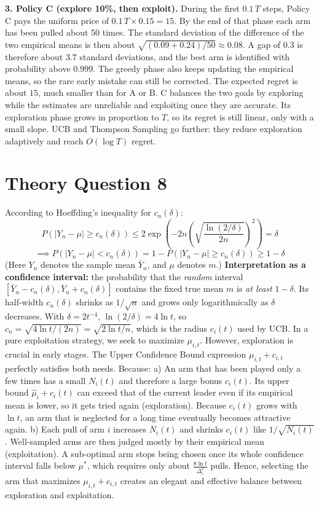 \documentclass[12pt,a4paper]{article}
\begin{document}
\textbf{3. Policy C (explore 10\%, then exploit).}
During the first $0.1\,T$ steps, Policy C pays the uniform price of $0.1\,T \times 0.15 = 15$.
By the end of that phase each arm has been pulled about 50 times.
The standard deviation of the difference of the two empirical means is then about $\sqrt{(0.09+0.24)/50} \approx 0.08$.
A gap of $0.3$ is therefore about $3.7$ standard deviations, and the best arm is identified with probability above $0.999$.
The greedy phase also keeps updating the empirical means, so the rare early mistake can still be corrected.
The expected regret is about $15$, much smaller than for A or B.
C balances the two goals by exploring while the estimates are unreliable and exploiting once they are accurate.
Its exploration phase grows in proportion to $T$, so its regret is still linear, only with a small slope.
UCB and Thompson Sampling go further: they reduce exploration adaptively and reach $O(\log T)$ regret.
%

\section*{Theory Question 8} %
According to Hoeffding's inequality for $c_n(\delta)$: %
\[
P(|Y_n - \mu| \geq c_n(\delta)) \leq 2 \exp\left( -2n \left(\sqrt{\frac{\ln(2/\delta)}{2n}}\right)^2 \right) = \delta
\] %
\[
\implies P(|Y_n - \mu| < c_n(\delta)) = 1 - P(|Y_n - \mu| \geq c_n(\delta)) \geq 1 - \delta
\] %
(Here $Y_n$ denotes the sample mean $\bar{Y}_n$, and $\mu$ denotes $m$.)
\textbf{Interpretation as a confidence interval:} the probability that the \emph{random} interval $[\bar{Y}_n - c_n(\delta) , \bar{Y}_n + c_n(\delta)]$ contains the fixed true mean $m$ is \emph{at least} $1-\delta$.
Its half-width $c_n(\delta)$ shrinks as $1/\sqrt{n}$ and grows only logarithmically as $\delta$ decreases.
With $\delta = 2t^{-4}$, $\ln(2/\delta) = 4\ln t$, so $c_n = \sqrt{4\ln t/(2n)} = \sqrt{2\ln t/n}$, which is the radius $c_i(t)$ used by UCB.
%
In a pure exploitation strategy, we seek to maximize $\mu_{i,t}$.
However, exploration is crucial in early stages.
The Upper Confidence Bound expression $\mu_{i,t} + c_{i,t}$ perfectly satisfies both needs.
Because:
a) An arm that has been played only a few times has a small $N_i(t)$ and therefore a large bonus $c_i(t)$.
Its upper bound $\hat{\mu}_i + c_i(t)$ can exceed that of the current leader even if its empirical mean is lower, so it gets tried again (exploration).
Because $c_i(t)$ grows with $\ln t$, an arm that is neglected for a long time eventually becomes attractive again.
%
b) Each pull of arm $i$ increases $N_i(t)$ and shrinks $c_i(t)$ like $1/\sqrt{N_i(t)}$.
Well-sampled arms are then judged mostly by their empirical mean (exploitation).
A sub-optimal arm stops being chosen once its whole confidence interval falls below $\mu^*$, which requires only about $\frac{8\ln t}{\Delta_i^2}$ pulls.
%
Hence, selecting the arm that maximizes $\mu_{i,t} + c_{i,t}$ creates an elegant and effective balance between exploration and exploitation.
%
\end{document}
